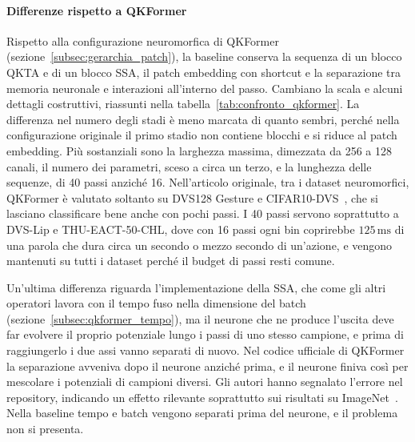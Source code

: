 \paragraph{Differenze rispetto a QKFormer}
\label{subsec:differenze_qkformer}

Rispetto alla configurazione neuromorfica di QKFormer (sezione~\ref{subsec:gerarchia_patch}), la baseline conserva la sequenza di un blocco QKTA e di un blocco SSA, il patch embedding con shortcut e la separazione tra memoria neuronale e interazioni all'interno del passo. Cambiano la scala e alcuni dettagli costruttivi, riassunti nella tabella~\ref{tab:confronto_qkformer}. La differenza nel numero degli stadi è meno marcata di quanto sembri, perché nella configurazione originale il primo stadio non contiene blocchi e si riduce al patch embedding. Più sostanziali sono la larghezza massima, dimezzata da 256 a 128 canali, il numero dei parametri, sceso a circa un terzo, e la lunghezza delle sequenze, di 40 passi anziché 16. Nell'articolo originale, tra i dataset neuromorfici, QKFormer è valutato soltanto su DVS128 Gesture e CIFAR10-DVS~\cite{zhou2024qkformer}, che si lasciano classificare bene anche con pochi passi. I 40 passi servono soprattutto a DVS-Lip e THU-EACT-50-CHL, dove con 16 passi ogni bin coprirebbe $125\,\mathrm{ms}$ di una parola che dura circa un secondo o mezzo secondo di un'azione, e vengono mantenuti su tutti i dataset perché il budget di passi resti comune.

Un'ultima differenza riguarda l'implementazione della SSA, che come gli altri operatori lavora con il tempo fuso nella dimensione del batch (sezione~\ref{subsec:qkformer_tempo}), ma il neurone che ne produce l'uscita deve far evolvere il proprio potenziale lungo i passi di uno stesso campione, e prima di raggiungerlo i due assi vanno separati di nuovo. Nel codice ufficiale di QKFormer la separazione avveniva dopo il neurone anziché prima, e il neurone finiva così per mescolare i potenziali di campioni diversi. Gli autori hanno segnalato l'errore nel repository, indicando un effetto rilevante soprattutto sui risultati su ImageNet~\cite{qkformerImplementationNotice}. Nella baseline tempo e batch vengono separati prima del neurone, e il problema non si presenta.

